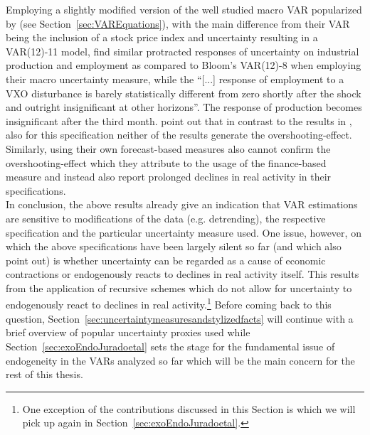 \documentclass[a4paper,11pt,listof=nochaptergap,oneside,pointednumbers,bibtotoc,bigheadings,liststotoc,hidelinks]{scrbook}
\theoremstyle{mysatz}
\theoremstyle{mydefinition}
\theoremstyle{mytheorem}
\theoremstyle{mybemerkung}
\begin{document}
Employing a slightly modified version of the well studied macro VAR popularized by \citet{christianoetal:05} (see Section~\ref{sec:VAREquations}), with the main difference from their VAR being the inclusion of a stock price index and uncertainty resulting in a VAR(12)-11 model, \citet[p. 1204]{juradoetal:15} find similar protracted responses of uncertainty on industrial production and employment as compared to Bloom's VAR(12)-8 when employing their macro uncertainty measure, while the ``[...] response of employment to a VXO disturbance is barely statistically different from zero shortly after the shock and outright insignificant at other horizons''. The response of production becomes insignificant after the third month. \citet{juradoetal:15} point out that in contrast to the results in \citet{bloom:09}, also for this specification neither of the results generate the overshooting-effect. Similarly, \citet{bachmannetal:13} using their own forecast-based measures also cannot confirm the overshooting-effect which they attribute to the usage of the finance-based measure and instead also report prolonged declines in real activity in their specifications.\\


In conclusion, the above results already give an indication that VAR estimations are sensitive to modifications of the data  (e.g. detrending), the respective specification and the particular uncertainty measure used. One issue, however, on which the above specifications have been largely silent so far (and which also \citet{juradoetal:15} point out) is whether uncertainty can be regarded as a cause of economic contractions or endogenously reacts to declines in real activity itself. This results from the application of recursive schemes which do not allow for uncertainty to endogenously react to declines in real activity.\footnote{One exception of the contributions discussed in this Section is \citet{bachmannetal:13} which we will pick up again in Section~\ref{sec:exoEndoJuradoetal}.} Before coming back to this question, Section~\ref{sec:uncertaintymeasuresandstylizedfacts} will continue with a brief overview of popular uncertainty proxies used while Section~\ref{sec:exoEndoJuradoetal} sets the stage for the fundamental issue of endogeneity in the VARs analyzed so far which will be the main concern for the rest of this thesis.
\end{document}
